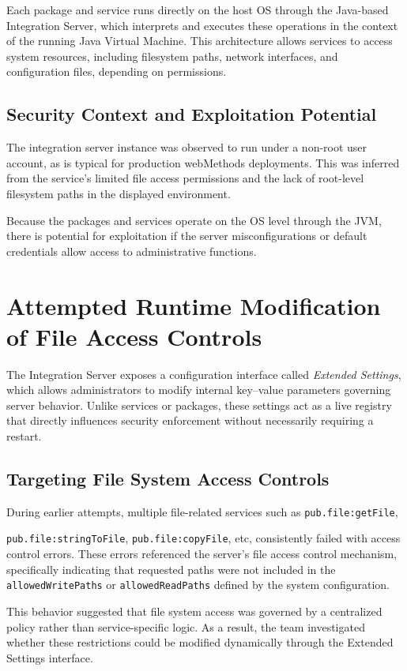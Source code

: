 \documentclass[12pt,a4paper]{report}
\begin{document}
Each package and service runs directly on the host OS through the Java-based Integration Server, which interprets and executes these operations in the context of the running Java Virtual Machine. This architecture allows services to access system resources, including filesystem paths, network interfaces, and configuration files, depending on permissions.


\subsection{Security Context and Exploitation Potential}

The integration server instance was observed to run under a non-root user account, as is typical for production webMethods deployments. This was inferred from the service’s limited file access permissions and the lack of root-level filesystem paths in the displayed environment.

Because the packages and services operate on the OS level through the JVM, there is potential for exploitation if the server misconfigurations or default credentials allow access to administrative functions.
\clearpage
\section{Attempted Runtime Modification of File Access Controls}
The Integration Server exposes a configuration interface called \emph{Extended Settings}, which allows administrators to modify internal key--value parameters governing server behavior. Unlike services or packages, these settings act as a live registry that directly influences security enforcement without necessarily requiring a restart.

\subsection{Targeting File System Access Controls}

During earlier attempts, multiple file-related services such as \texttt{pub.file:getFile},

\texttt{pub.file:stringToFile}, \texttt{pub.file:copyFile}, etc, consistently failed with access control errors. These errors referenced the server’s file access control mechanism, specifically indicating that requested paths were not included in the \texttt{allowedWritePaths} or \texttt{allowedReadPaths} defined by the system configuration.

This behavior suggested that file system access was governed by a centralized policy rather than service-specific logic. As a result, the team investigated whether these restrictions could be modified dynamically through the Extended Settings interface.
\end{document}
